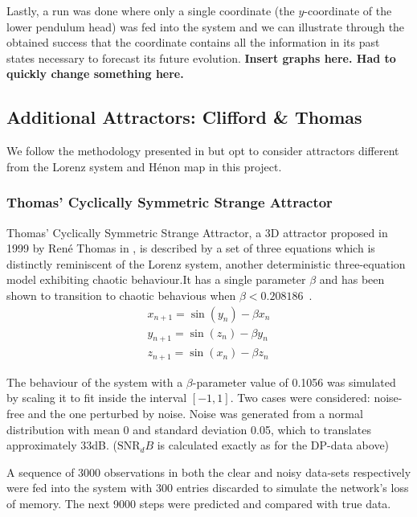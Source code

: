 \documentclass[a4paper,12pt,twoside]{report}
\begin{document}
 Lastly, a run was done where only a single coordinate (the $y$-coordinate of the lower pendulum head) was fed into the system and we can illustrate through the obtained success that the coordinate contains all the information in its past states necessary to forecast its future evolution.
 \textbf{Insert graphs here. Had to quickly change something here.}
 

\subsection{Additional Attractors: Clifford \& Thomas}
We follow the methodology presented in \cite{manjunath2021universal} but opt to consider attractors different from the Lorenz system and H\'enon map in this project.

\subsubsection{Thomas' Cyclically Symmetric Strange Attractor}\label{Thomas_Attractor}
Thomas' Cyclically Symmetric Strange Attractor, a 3D attractor proposed in 1999 by Ren\'e Thomas in \cite{ThomasAttractor}, is described by a set of three equations which is distinctly reminiscent of the Lorenz system, another deterministic three-equation model exhibiting chaotic behaviour.It has a single parameter $\beta$ and has been shown to transition to chaotic behavious when $\beta<0.208186$~\cite{Thomas_BetaParameter}.
\begin{eqnarray}\label{eqns_thomas}
  x_{n+1} = \sin(y_n) - \beta{x_n} \\
  y_{n+1} = \sin(z_n) - \beta{y_n} \\
  z_{n+1} = \sin(x_n) - \beta{z_n}
\end{eqnarray}

The behaviour of the system with a $\beta$-parameter value of 0.1056 was simulated by scaling it to fit inside the interval $[-1,1]$. Two cases were considered: noise-free and the one perturbed by noise. Noise was generated from a normal distribution with mean 0 and standard deviation 0.05, which to translates approximately 33dB. 
($\text{SNR}_dB$ is calculated exactly as for the DP-data above)

A sequence of 3000 observations in both the clear and noisy data-sets respectively were fed into the system with 300 entries discarded to simulate the network's loss of memory. The next 9000 steps were predicted and compared with true data.
\end{document}
